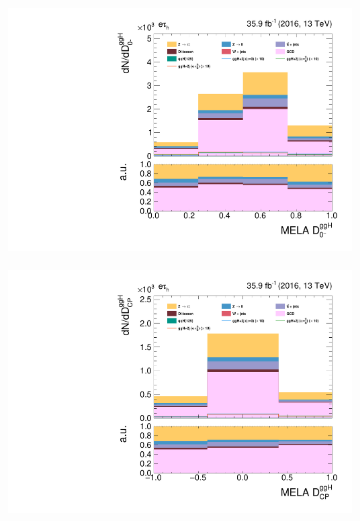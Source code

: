 \begin{figure}[h!]
\begin{subfigure}{.3\textwidth}
        \includegraphics[width=\textwidth]{Figures/eventselection/et/dijet2D_lowboost/melaDiscriminatorD0MinusGGH.pdf}
    \end{subfigure}%
    \begin{subfigure}{.3\textwidth}
        \centering
        \includegraphics[width=\textwidth]{Figures/eventselection/et/dijet2D_lowboost/melaDiscriminatorDCPGGH.pdf}
    \end{subfigure} \\ %
    \begin{subfigure}{.3\textwidth}
        \centering

\end{subfigure}
\end{figure}
